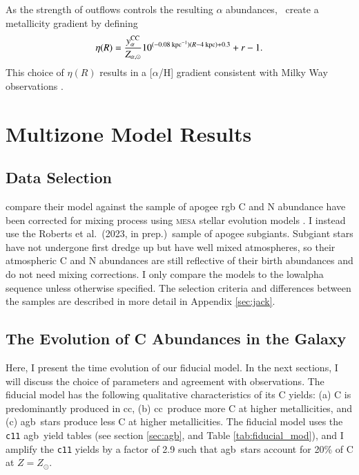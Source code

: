 \documentclass[12pt,oneside,letterpaper]{report}
\newcommand{\cc}{\gls{cc}}
\newcommand{\agb}{\gls{agb}}
\newcommand{\apogee}{\gls{apogee}}
\newcommand{\cxi}{\texttt{\gls{c11}}}
\newcommand{\JJ}{\citetalias{james+21}}
\newcommand{\citetjack}{Roberts et al.~(2023, in prep.)}
\begin{document}
As the strength of outflows controls the resulting $\alpha$ abundances, \JJ~create a metallicity gradient by defining
\begin{equation}
\eta(R) = \frac{y_{\alpha}^{\rm CC}}{Z_{\alpha, \odot}} 10^{(-0.08\text{ kpc}^{-1})(R-4\text{ kpc})+0.3} + r - 1.
\end{equation}
This choice of $\eta(R)$ results in a [$\alpha$/H] gradient consistent with Milky Way observations \citep[e.g.][]{hayden+14, weinberg+19, frinchaboy+13}.


\chapter{Multizone Model Results}
\section{Data Selection}

\citet{james+23} compare their model against the \cite{vincenzo+21} sample of \apogee{} \citep{apogee17} \gls{rgb} C and N abundance have been corrected for mixing process using \textsc{mesa} stellar evolution models \citep{mesa}. 
I instead use the \citetjack~sample of \apogee{} \gls{subgiant}s. Subgiant stars have not undergone first dredge up but have well mixed atmospheres, so their atmospheric C and N abundances are still reflective of their birth abundances and do not need mixing corrections. I only compare the models to the \gls{lowalpha} sequence unless otherwise specified.  The selection criteria and differences between the samples are described in more detail in Appendix \ref{sec:jack}.



\section{The Evolution of C Abundances in the Galaxy}

Here, I present the time evolution of our fiducial model. In the next sections, I will discuss the choice of parameters and agreement with observations. 
The fiducial model has the following qualitative characteristics of its C yields: (a) C is predominantly produced in \cc, (b) \cc\ produce more C at higher metallicities, and (c) \agb\ stars produce less C at higher metallicities. The fiducial model uses the \cxi{} \agb\ yield tables (see section \ref{sec:agb}, and Table \ref{tab:fiducial_mod}), and I amplify the \cxi{} yields by a factor of 2.9 such that \agb\ stars account for 20\% of C at $Z=Z_\odot$. 
\end{document}
